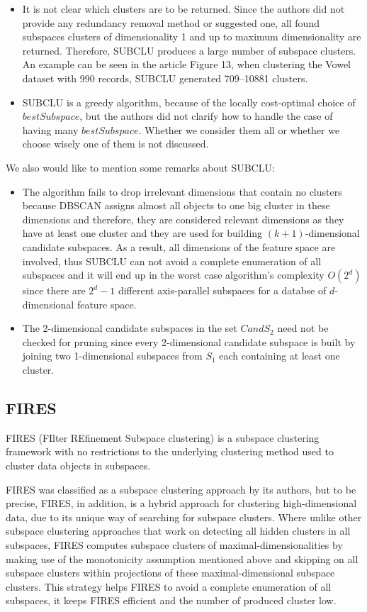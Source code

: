 \begin{itemize}
	\item It is not clear which clusters are to be returned. Since the authors did not provide any redundancy removal method or suggested one, all found subspaces clusters of dimensionality 1 and up to maximum dimensionality are returned. Therefore, SUBCLU produces a large number of subspace clusters. An example can be seen in the article \citep{10.14778/1687627.1687770} Figure 13, when clustering the Vowel dataset with 990 records, SUBCLU generated 709--10881 clusters.
	\item SUBCLU is a greedy algorithm, because of the locally cost-optimal choice of $bestSubspace$, but the authors did not clarify how to handle the case of having many $bestSubspace$. Whether we consider them all or whether we choose wisely one of them is not discussed. 
\end{itemize}
We also would like to mention some remarks about SUBCLU:
\begin{itemize}
	\item The algorithm fails to drop irrelevant dimensions that contain no clusters because DBSCAN assigns almost all objects to one big cluster in these dimensions and therefore, they are considered relevant dimensions as they have at least one cluster and they are used for building $(k + 1)$-dimensional candidate subspaces. As a result, all dimensions of the feature space are involved, thus SUBCLU can not avoid a complete enumeration of all subspaces and it will end up in the worst case algorithm's complexity $O(2^{d})$ since there are $2^{d}-1$ different axis-parallel subspaces for a databse of $d$-dimensional feature space.
 	\item The 2-dimensional candidate subspaces in the set $CandS_{2}$ need not be checked for pruning since every 2-dimensional candidate subspace is built by joining two 1-dimensional subspaces from $S_{1}$ each containing at least one cluster. 
\end{itemize}


\subsection{FIRES}
FIRES (FIlter REfinement Subspace clustering) \citep{fires} is a subspace clustering framework with no restrictions to the underlying clustering method used to cluster data objects in subspaces.

FIRES was classified as a subspace clustering approach by its authors, but to be precise, FIRES, in addition, is a hybrid approach for clustering high-dimensional data, due to its unique way of searching for subspace clusters. Where unlike other subspace clustering approaches that work on detecting all hidden clusters in all subspaces, FIRES computes subspace clusters of maximal-dimensionalities by making use of the monotonicity assumption mentioned above and skipping on all subspace clusters within projections of these maximal-dimensional subspace clusters. This strategy helps FIRES to avoid a complete enumeration of all subspaces, it keeps FIRES efficient and the number of produced cluster low.

